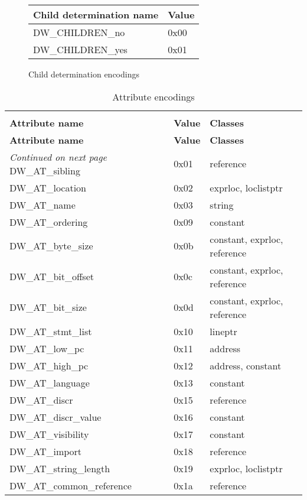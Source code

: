 \begin{figure}[here]
\centering
\setlength{\extrarowheight}{0.1cm}
\caption{Child determination encodings}
\label{tab:childdeterminationencodings}
\begin{tabular}{l|l} \hline
Child determination name& Value\\ \hline
DW\_CHILDREN\_no&0x00 \\ 
DW\_CHILDREN\_yes&0x01 \\ \hline
\end{tabular}
\end{figure}


\begin{centering}
\setlength{\extrarowheight}{0.1cm}
\begin{longtable}{l|l|l}
  \caption{Attribute encodings} \label{tab:attributeencodings} \\
  \hline \\ \bfseries Attribute name&\bfseries Value &\bfseries Classes \\ \hline
\endfirsthead
  \bfseries Attribute name&\bfseries Value &\bfseries Classes\\ \hline
\endhead
  \hline \emph{Continued on next page}
\endfoot
  \hline
\endlastfoot
DW\_AT\_sibling&0x01&reference \\
DW\_AT\_location&0x02&exprloc, loclistptr   \\
DW\_AT\_name&0x03&string   \\
DW\_AT\_ordering&0x09&constant   \\
DW\_AT\_byte\_size&0x0b&constant, exprloc, reference   \\
DW\_AT\_bit\_offset&0x0c&constant, exprloc, reference   \\
DW\_AT\_bit\_size&0x0d&constant, exprloc, reference   \\
DW\_AT\_stmt\_list&0x10&lineptr   \\
DW\_AT\_low\_pc&0x11&address   \\
DW\_AT\_high\_pc&0x12&address, constant   \\
DW\_AT\_language&0x13&constant   \\
DW\_AT\_discr&0x15&reference   \\
DW\_AT\_discr\_value&0x16&constant   \\
DW\_AT\_visibility&0x17&constant   \\
DW\_AT\_import&0x18&reference   \\
DW\_AT\_string\_length&0x19&exprloc, loclistptr   \\
DW\_AT\_common\_reference&0x1a&reference   \\

\end{longtable}
\end{centering}
